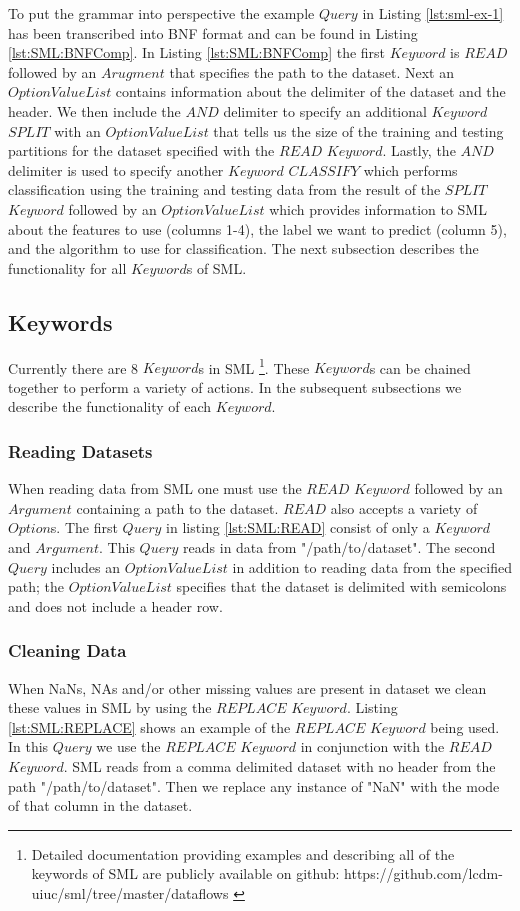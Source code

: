 To put the grammar into perspective the example \(Query\) in Listing \ref{lst:sml-ex-1} has been transcribed into BNF format and can be found in Listing \ref{lst:SML:BNFComp}. In  Listing \ref{lst:SML:BNFComp}  the first \(Keyword\) is \(READ\) followed by an \(Arugment\) that specifies the path to the dataset. Next an \(OptionValueList\) contains information about the delimiter of the dataset and the header. We then include the \(AND\) delimiter to specify an additional \(Keyword\) \(SPLIT\) with an \(OptionValueList\) that tells us the size of the training and testing partitions for the dataset specified with the \(READ\) \(Keyword\). Lastly, the \(AND\) delimiter is used to specify another \(Keyword\) \(CLASSIFY\) which performs classification using the training and testing data from the result of the  \(SPLIT\) \(Keyword\) followed by an \(OptionValueList\) which provides information  to SML about the features to use (columns 1-4), the label we want to predict (column 5), and the algorithm to use for classification. The next subsection describes the functionality for all \(Keyword\)s of SML.

\subsection{Keywords}
Currently there are 8 \(Keyword\)s in SML \footnote{Detailed documentation providing examples and describing all of the keywords of SML are publicly available on github: https://github.com/lcdm-uiuc/sml/tree/master/dataflows \label{SML:Dataflow}}. These \(Keyword\)s can be chained together to perform a variety of actions. In the subsequent subsections we describe the functionality of each \(Keyword\).

\subsubsection{Reading Datasets}
When reading data from SML one must use the \(READ\) \(Keyword\) followed by an \(Argument\) containing a path to the dataset. \(READ\) also accepts a variety of \(Option\)s. The first \(Query\) in listing \ref{lst:SML:READ} consist of only a \(Keyword\) and \(Argument\). This \(Query\) reads in data from "/path/to/dataset". The second \(Query\) includes an \(OptionValueList\) in addition to reading data from the specified path; the \(OptionValueList\) specifies that the dataset is delimited with semicolons and does not include a header row. 


\subsubsection{Cleaning Data}
When NaNs, NAs and/or other missing values are present in dataset we clean these values in SML by using the \(REPLACE\) \(Keyword\).  Listing \ref{lst:SML:REPLACE}  shows an example of the \(REPLACE\) \(Keyword\) being used. In this \(Query\) we use the \(REPLACE\) \(Keyword\) in conjunction with the \(READ\) \(Keyword\).  SML reads from a comma delimited dataset with no header from the path "/path/to/dataset". Then we replace any instance of "NaN" with the mode of that column in the dataset.


